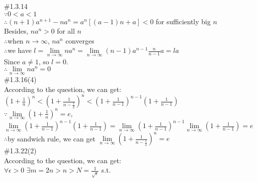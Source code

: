 \documentclass{article}
\begin{document}
\textcolor[rgb]{0.00,0.00,0.50}{\#1.3.14}\\

$\because$\qquad $0<a<1$\\

$\therefore$\qquad $(n+1)a^{n+1}-na^n=a^n\left[(a-1)n+a\right]<0$ for sufficiently big $n$\\

\quad\qquad Besides, $na^n>0$ for all $n$\\

$\therefore$\qquad when $n \to \infty$, $na^n$ converges\\

$\therefore$\qquad we have $\displaystyle l=\lim \limits_{n \to \infty}na^n=\lim \limits_{n \to \infty}(n-1)a^{n-1}\frac{n}{n-1}a=la$\\

\quad\qquad Since $a\ne1$, so $l=0$.\\

$\therefore$\qquad $\lim \limits_{n \to \infty}na^n=0$\\

\textcolor[rgb]{0.00,0.00,0.50}{\#1.3.16(4)}\\

According to the question, we can get:\\

$\displaystyle \left(1+\frac{1}{n}\right)^n<\left(1+\frac{1}{n-\frac{1}{2}}\right)^n<\left(1+\frac{1}{n-1}\right)^{n-1}\left(1+\frac{1}{n-1}\right)$\\

$\because$\qquad $\lim \limits_{n \to \infty}\left(1+\frac{1}{n}\right)^n=e$,\quad $\lim \limits_{n \to \infty}\left(1+\frac{1}{n-1}\right)^{n-1}\left(1+\frac{1}{n-1}\right)=\lim \limits_{n \to \infty}\left(1+\frac{1}{n-1}\right)^{n-1}\lim \limits_{n \to \infty}\left(1+\frac{1}{n-1}\right)=e$\\

$\therefore$\qquad by sandwich rule, we can get $\lim \limits_{n \to \infty}\left(1+\frac{1}{n-\frac{1}{2}}\right)^n=e$\\

\textcolor[rgb]{0.00,0.00,0.50}{\#1.3.22(2)}\\

According to the question, we can get:\\

$\forall \epsilon>0$ $\displaystyle \exists m=2n>n>N=\frac{1}{\sqrt{\epsilon}}$ s.t. \\
\end{document}
